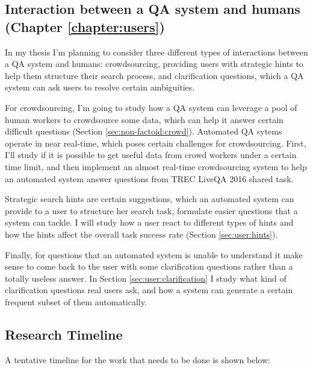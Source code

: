 \subsection{Interaction between a QA system and humans (Chapter \ref{chapter:users})}
\label{sec:plan4}

In my thesis I'm planning to consider three different types of interactions between a QA system and humans: crowdsourcing, providing users with strategic hints to help them structure their search process, and clarification questions, which a QA system can ask users to resolve certain ambiguities.

For crowdsourcing, I'm going to study how a QA system can leverage a pool of human workers to crowdsource some data, which can help it answer certain difficult questions (Section \ref{sec:non-factoid:crowd}).
Automated QA sytems operate in near real-time, which poses certain challenges for crowdsourcing.
First, I'll study if it is possible to get useful data from crowd workers under a certain time limit, and then implement an almost real-time crowdsourcing system to help an automated system answer questions from TREC LiveQA 2016 shared task.

Strategic search hints are certain suggestions, which an automated system can provide to a user to structure her search task, formulate easier questions that a system can tackle.
I will study how a user react to different types of hints and how the hints affect the overall task success rate (Section \ref{sec:user:hints}).

Finally, for questions that an automated system is unable to understand it make sense to come back to the user with some clarification questions rather than a totally useless answer.
In Section \ref{sec:user:clarification} I study what kind of clarification questions real users ask, and how a system can generate a certain frequent subset of them automatically.


\subsection{Research Timeline}

\noindent
A tentative timeline for the work that needs to be done is shown below:

